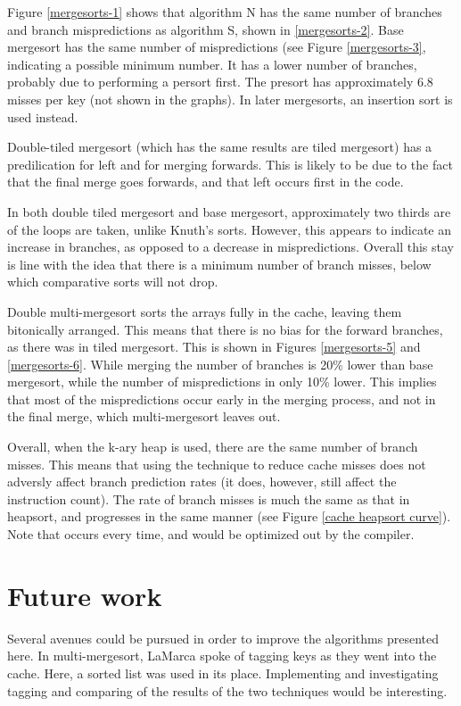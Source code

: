 Figure \ref{mergesorts-1} shows that algorithm N has the same number of branches
and branch mispredictions as algorithm S, shown in \ref{mergesorts-2}. Base
mergesort has the same number of mispredictions (see Figure \ref{mergesorts-3},
indicating a possible minimum number. It has a lower number of branches,
probably due to performing a persort first. The presort has approximately 6.8
misses per key (not shown in the graphs). In later mergesorts, an insertion sort
is used instead.

Double-tiled mergesort (which has the same results are tiled mergesort) has a
predilication for left and for merging forwards. This is likely to be due to the
fact that the final merge goes forwards, and that left occurs first in the code.

In both double tiled mergesort and base mergesort, approximately two thirds are
of the loops are taken, unlike Knuth's sorts. However, this appears to indicate
an increase in branches, as opposed to a decrease in mispredictions. Overall
this stay is line with the idea that there is a minimum number of branch misses,
below which comparative sorts will not drop.

Double multi-mergesort sorts the arrays fully in the cache, leaving them
bitonically arranged. This means that there is no bias for the forward branches,
as there was in tiled mergesort. This is shown in Figures \ref{mergesorts-5} and
\ref{mergesorts-6}. While merging the number of branches is 20\% lower than base
mergesort, while the number of mispredictions in only 10\% lower. This implies
that most of the mispredictions occur early in the merging process, and not in
the final merge, which multi-mergesort leaves out.

Overall, when the k-ary heap is used, there are the same number of branch
misses. This means that using the technique to reduce cache misses does not
adversly affect branch prediction rates (it does, however, still affect the
instruction count).  The rate of branch misses is much the same as that in
heapsort, and progresses in the same manner (see Figure \ref{cache heapsort
curve}). Note that  occurs every time, and would be optimized
out by the compiler.


\section{Future work}
Several avenues could be pursued in order to improve the algorithms presented
here. In multi-mergesort, LaMarca spoke of tagging keys as they went into the
cache. Here, a sorted list was used in its place. Implementing and investigating
tagging and comparing of the results of the two techniques would be interesting.

